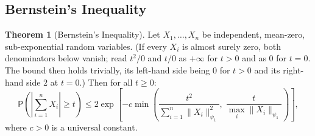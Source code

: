 \documentclass[12pt,a4paper]{article}
\theoremstyle{definition}
\newtheorem{theorem}{Theorem}[section]
\newcommand\prb{\mathsf{P}}
\begin{document}
\subsection{Bernstein's Inequality}

\begin{theorem}[Bernstein's Inequality]\label{thm:bernstein}
Let $X_1, \ldots, X_n$ be independent, mean-zero, sub-exponential random variables. (If every $X_i$ is almost surely zero, both denominators below vanish; read $t^2/0$ and $t/0$ as $+\infty$ for $t > 0$ and as $0$ for $t = 0$. The bound then holds trivially, its left-hand side being $0$ for $t > 0$ and its right-hand side $2$ at $t = 0$.) Then for all $t \geqslant 0$:
\begin{equation}\label{eq:bernstein}
\boxed{\prb\!\left(\left|\sum_{i=1}^n X_i\right| \geqslant t\right) \leqslant 2\exp\!\left[-c\min\!\left(\frac{t^2}{\sum_{i=1}^n \|X_i\|_{\psi_1}^2},\; \frac{t}{\max_i \|X_i\|_{\psi_1}}\right)\right],}
\end{equation}
where $c > 0$ is a universal constant.
\end{theorem}
\end{document}

